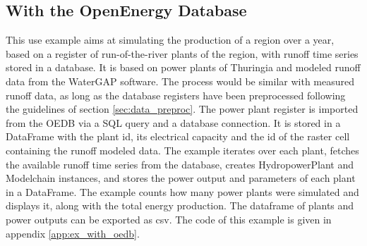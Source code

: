\subsection{With the OpenEnergy Database}
\label{sub:ex_with_oedb}

This use example aims at simulating the production of a region over a year, based on a register of run-of-the-river plants of the region, with runoff time series stored in a database. It is based on power plants of Thuringia and modeled runoff data from the WaterGAP software. The process would be similar with measured runoff data, as long as the database registers have been preprocessed following the guidelines of section \ref{sec:data_preproc}. \newline
The power plant register is imported from the OEDB via a SQL query and a database connection. It is stored in a DataFrame with the plant id, its electrical capacity and the id of the raster cell containing the runoff modeled data. The example iterates over each plant, fetches the available runoff time series from the database, creates HydropowerPlant and Modelchain instances, and stores the power output and parameters of each plant in a DataFrame. \newline
The example counts how many power plants were simulated and displays it, along with the total energy production. The dataframe of plants and power outputs can be exported as csv.\newline
The code of this example is given in appendix \ref{app:ex_with_oedb}.
